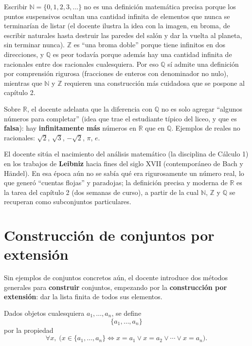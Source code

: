 \documentclass[12pt,a4paper]{article}
\begin{document}
\begin{warnbox}
Escribir $\mathbb{N} = \{0, 1, 2, 3, \ldots\}$ no es una definición
matemática precisa porque los puntos suspensivos ocultan una cantidad
infinita de elementos que nunca se terminarían de listar (el docente
ilustra la idea con la imagen, en broma, de escribir naturales hasta
destruir las paredes del salón y dar la vuelta al planeta, sin terminar
nunca). $\mathbb{Z}$ es ``una broma doble'' porque tiene infinitos en dos
direcciones, y $\mathbb{Q}$ es peor todavía porque además hay una cantidad
infinita de racionales entre dos racionales cualesquiera. Por eso
$\mathbb{Q}$ sí admite una definición por comprensión rigurosa (fracciones
de enteros con denominador no nulo), mientras que $\mathbb{N}$ y
$\mathbb{Z}$ requieren una construcción más cuidadosa que se pospone al
capítulo 2.
\end{warnbox}

Sobre $\mathbb{R}$, el docente adelanta que la diferencia con $\mathbb{Q}$
no es solo agregar ``algunos números para completar'' (idea que trae el
estudiante típico del liceo, y que es \textbf{falsa}): hay
\textbf{infinitamente más} números en $\mathbb{R}$ que en $\mathbb{Q}$.
Ejemplos de reales no racionales: $\sqrt{2}$, $\sqrt{3}$, $-\sqrt{2}$,
$\pi$, $e$.

\begin{notebox}
El docente sitúa el nacimiento del análisis matemático (la disciplina de
Cálculo 1) en los trabajos de \textbf{Leibniz} hacia fines del siglo XVII
(contemporáneo de Bach y Händel). En esa época aún no se sabía qué era
rigurosamente un número real, lo que generó ``cuentas flojas'' y
paradojas; la definición precisa y moderna de $\mathbb{R}$ es la tarea del
capítulo 2 (dos semanas de curso), a partir de la cual $\mathbb{N}$,
$\mathbb{Z}$ y $\mathbb{Q}$ se recuperan como subconjuntos particulares.
\end{notebox}

\section{Construcción de conjuntos por extensión}

Sin ejemplos de conjuntos concretos aún, el docente introduce dos métodos
generales para \textbf{construir} conjuntos, empezando por la
\textbf{construcción por extensión}: dar la lista finita de todos sus
elementos.

Dados objetos cualesquiera $a_1, \ldots, a_n$, se define
\[
\{a_1, \ldots, a_n\}
\]
por la propiedad
\[
\forall x,\; \big(x \in \{a_1,\ldots,a_n\} \iff x = a_1 \lor x = a_2 \lor \cdots \lor x = a_n\big).
\]
\end{document}
